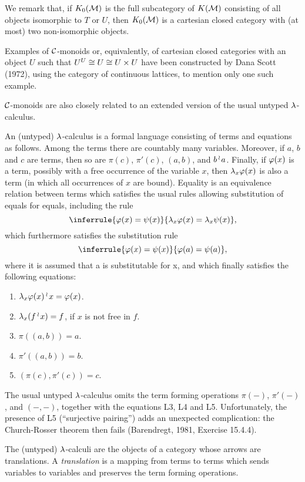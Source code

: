 We remark that, if $K_0({\mathcal M})$ is the full subcategory of $K({\mathcal M})$ consisting
of all objects isomorphic to $T$ or $U$, then $K_0({\mathcal M})$ is a cartesian closed
category with (at most) two non-isomorphic objects.

Examples of $\mathcal C$-monoids or, equivalently, of cartesian closed categories
with an object $U$ such that $U^{U} \cong U \cong U \times U$
have been constructed by Dana Scott (1972), using the category of continuous
lattices, to mention only one such example.

$\mathcal C$-monoids are also closely related to an extended version of the usual
untyped $\lambda$-calculus.

\begin{defn}
An (untyped) $\lambda$-calculus is a formal language consisting
of terms and equations as follows. Among the terms there are countably many
variables. Moreover, if $a$, $b$ and $c$ are terms, then so are
$\pi(c)$, $\pi'(c)$, $(a,b)$, and $b \mathop{{}^\wr}\kern-.8pt a$.
Finally, if $\varphi(x)$ is a term, possibly with a free occurrence
of the variable $x$, then $\lambda_x\varphi(x)$ is also a term (in which all occurrences of
$x$ are bound). Equality is an equivalence relation between terms which
satisfies the usual rules allowing substitution of equals for equals, including
the rule
\[
\inferrule{\pf(x) = \psi(x)}{\lx \pf(x) = \lx \psi(x)},
\]
which furthermore satisfies the substitution rule
\[
\inferrule{\pf(x) = \psi(x)}{ \pf(a) = \psi(a)},
\]
where it is assumed that a is substitutable for x, and which finally
satisfies the following equations:
\begin{enumerate}[label=L\theenumi.]
\item $\lambda_x \varphi(x)\mathop{{}^\wr}\kern-.8pt x = \varphi(x)$.
\item $\lambda_x (f \mathop{{}^\wr}\kern-.8pt x) = f$, if $x$ is not free in $f$.
\item $\pi((a,b)) = a$.
\item $\pi'((a,b)) = b$.
\item $(\pi(c), \pi' (c)) = c$.
\end{enumerate}
\end{defn}

The usual untyped $\lambda$-calculus omits the term forming operations $\pi(-)$,
$\pi'(-)$, and $(-,-)$, together with the equations L3, L4 and L5. Unfortunately,
the presence of L5 (``surjective pairing'') adds an unexpected complication:
the Church-Rosser theorem then fails (Barendregt, 1981, Exercise 15.4.4).

The (untyped) $\lambda$-calculi are the objects of a category whose arrows are
translations. A {\em translation} is a mapping from terms to terms which sends
variables to variables and preserves the term forming operations.

